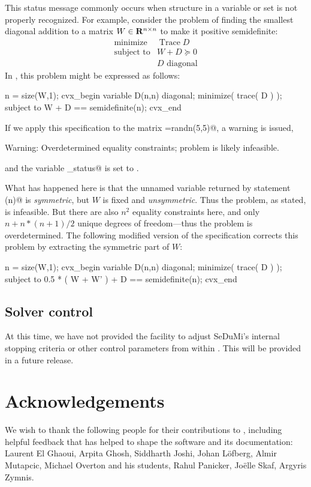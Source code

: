 \documentclass[12pt]{article}
\begin{document}
This status message \verb@Overdetermined@ commonly occurs when structure
in a variable or set is not properly recognized. For example, consider the problem
of finding the smallest diagonal addition to a matrix $W\in\mathbf{R}^{{n}\times{n}}$ to make it positive semidefinite:
\begin{equation}
	\begin{array}{rl}
		\text{minimize} & \mathop{\text{Trace}} D \\
		\text{subject to} & W + D \succeq 0 \\
		                  & D \text{~diagonal}
	\end{array}
\end{equation}
In \cvx, this problem might be expressed as follows:
\begin{code}
	n = size(W,1);
	cvx_begin
	    variable D(n,n) diagonal;
	    minimize( trace( D ) );
	    subject to
	        W + D == semidefinite(n);
	cvx_end
\end{code}
If we apply this specification to the matrix \verb@W=randn(5,5)@, a warning is issued,
\begin{code}
	Warning: Overdetermined equality constraints;
	    problem is likely infeasible.
\end{code}
and the variable \verb@cvx_status@ is set to \verb@Overdetermined@. 

What has happened here
is that the unnamed variable returned by statement \verb@semidefinite(n)@ is \emph{symmetric}, but
$W$ is fixed and \emph{unsymmetric}. Thus the problem, as stated, is infeasible. But
there are also $n^2$ equality constraints here, and only $n+n*(n+1)/2$ unique degrees
of freedom---thus the problem is overdetermined. The following modified 
version of the specification corrects this problem by extracting the symmetric part of $W$:
\begin{code}
	n = size(W,1);
	cvx_begin
	    variable D(n,n) diagonal;
	    minimize( trace( D ) );
	    subject to
	        0.5 * ( W + W' ) + D == semidefinite(n);
	cvx_end
\end{code}

\subsection{Solver control}

At this time, we have not provided the facility to adjust SeDuMi's internal 
stopping criteria or other control parameters from within \cvx. This will be provided
in a future release.

\section{Acknowledgements}

We wish to thank the following people for their contributions to
\cvx, including helpful feedback that has helped to shape the 
software and its documentation:  Laurent El Ghaoui, Arpita Ghosh, 
Siddharth Joshi, Johan L\"{o}fberg, Almir Mutapcic, Michael Overton
and his students, Rahul Panicker, Jo\"{e}lle Skaf, Argyris Zymnis.


\newpage

\end{document}
